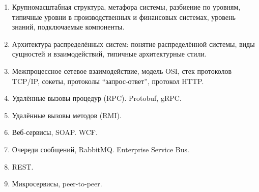 \documentclass[a5paper]{article}
\begin{document}
\begin{enumerate}
	\item Крупномасштабная структура, метафора системы, разбиение по уровням, типичные уровни в производственных и финансовых системах, уровень знаний, подключаемые компоненты.
	\item Архитектура распределённых систем: понятие распределённой системы, виды сущностей и взаимодействий, типичные архитектурные стили.
	\item Межпроцессное сетевое взаимодействие, модель OSI, стек протоколов TCP/IP, сокеты, протоколы ``запрос-ответ'', протокол HTTP.
	\item Удалённые вызовы процедур (RPC). Protobuf, gRPC.
	\item Удалённые вызовы методов (RMI).
	\item Веб-сервисы, SOAP. WCF.
	\item Очереди сообщений, RabbitMQ. Enterprise Service Bus.
	\item REST.
	\item Микросервисы, peer-to-peer.
\end{enumerate}
\end{document}
